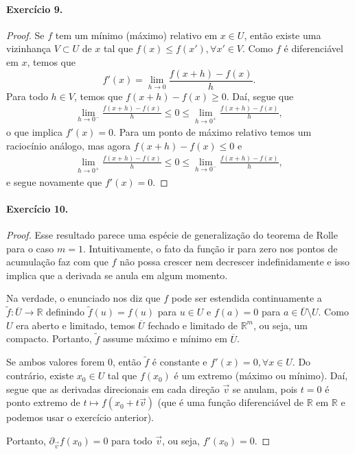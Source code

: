 \documentclass[12pt,a4paper]{article}
\newcommand{\R}{\mathbb{R}}
\begin{document}
\paragraph{Exercício 9.}
    \begin{proof}
        Se $f$ tem um mínimo (máximo) relativo em $x\in U$, então existe uma vizinhança $V\subset U$ de 
        $x$ tal que $f(x) \leq f(x'), \forall x'\in V$. Como $f$ é diferenciável em $x$, temos que
        \begin{equation*}
            f'(x) = \lim_{h\to 0} \frac{f(x + h) - f(x)}{h}.
        \end{equation*}
        Para todo $h\in V$, temos que $f(x+h) - f(x) \geq 0$. Daí, segue que
        \begin{align*}
            \lim_{h\to 0^-} \frac{f(x + h) - f(x)}{h} \leq 0 \leq \lim_{h\to 0^+} \frac{f(x + h) - f(x)}{h},
        \end{align*}
        o que implica $f'(x) = 0$. Para um ponto de máximo relativo temos um raciocínio análogo, mas
        agora $f(x+h) - f(x) \leq 0$ e
        \begin{align*}
            \lim_{h\to 0^+} \frac{f(x + h) - f(x)}{h} \leq 0 \leq \lim_{h\to 0^-} \frac{f(x + h) - f(x)}{h},
        \end{align*}
        e segue novamente que $f'(x) = 0$.
    \end{proof}
\paragraph{Exercício 10.}
    \begin{proof}
        Esse resultado parece uma espécie de generalização do teorema de Rolle para o caso $m=1$.
        Intuitivamente, o fato da função ir para zero nos pontos de acumulação faz com que $f$ não
        possa crescer nem decrescer indefinidamente e isso implica que a derivada se anula em
        algum momento.
        
        Na verdade, o enunciado nos diz que $f$ pode ser estendida continuamente a 
        $\widetilde{f}:\overline{U}\to\R$ definindo $\widetilde{f}(u) = f(u)$ para $u\in U$
        e $f(a) = 0$ para $a\in\overline{U}\setminus U$. Como $U$ era aberto e limitado, temos
        $\overline{U}$ fechado e limitado de $\R^m$, ou seja, um compacto.
        Portanto, $\widetilde{f}$ assume máximo e mínimo em $\overline{U}$.
        
        Se ambos valores forem $0$, então $\widetilde{f}$ é constante e $f'(x) = 0, \forall x\in U$.
        Do contrário, existe $x_0\in U$ tal que $f(x_0)$ é um extremo (máximo ou mínimo). Daí,
        segue que as derivadas direcionais em cada direção $\vec{v}$ se anulam, pois
        $t=0$ é ponto extremo de $t\mapsto f(x_0 + t\vec{v})$ (que é uma função diferenciável de
        $\R$ em $\R$ e podemos usar o exercício anterior).
        
        Portanto, $\partial_{\vec{v}} f(x_0) = 0$ para todo $\vec{v}$, ou seja, $f'(x_0) = 0$.
    \end{proof}
\end{document}

